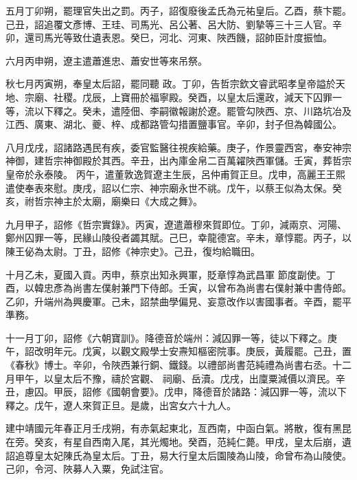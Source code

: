 \begin{pinyinscope}
 五月丁卯朔，罷理官失出之罰。丙子，詔復廢後孟氏為元祐皇后。乙酉，蔡卞罷。己丑，詔追覆文彥博、王珪、司馬光、呂公著、呂大防、劉摯等三十三人官。辛卯，還司馬光等致仕遺表恩。癸巳，河北、河東、陜西饑，詔帥臣計度振恤。



 六月丙申朔，遼主遣蕭進忠、蕭安世等來吊祭。



 秋七月丙寅朔，奉皇太后詔，罷同聽
 政。丁卯，告哲宗欽文睿武昭孝皇帝謚於天地、宗廟、社稷。戊辰，上寶冊於福寧殿。癸酉，以皇太后還政，減天下囚罪一等，流以下釋之。癸未，遣陸佃、李嗣徽報謝於遼。罷管勾陜西、京、川路坑冶及江西、廣東、湖北、夔、梓、成都路管勾措置鹽事官。辛卯，封子但為韓國公。



 八月戊戌，詔諸路遇民有疾，委官監醫往視疾給藥。庚子，作景靈西宮，奉安神宗神御，建哲宗神御殿於其西。辛丑，出內庫金帛二百萬糴陜西軍儲。壬寅，葬哲宗皇帝於永泰陵。
 丙午，遣董敦逸賀遼主生辰，呂仲甫賀正旦。戊申，高麗王王熙遣使奉表來慰。庚戌，詔以仁宗、神宗廟永世不祧。戊午，以蔡王似為太保。癸亥，祔哲宗神主於太廟，廟樂曰《大成之舞》。



 九月甲子，詔修《哲宗實錄》。丙寅，遼遣蕭穆來賀即位。丁卯，減兩京、河陽、鄭州囚罪一等，民緣山陵役者蠲其賦。己巳，幸龍德宮。辛未，章惇罷。丙子，以陳王佖為太尉。丁丑，詔修《神宗史》。己丑，復均給職田。



 十月乙未，夏國入貢。丙申，蔡京出知永興軍，貶章惇為武昌軍
 節度副使。丁酉，以韓忠彥為尚書左僕射兼門下侍郎。壬寅，以曾布為尚書右僕射兼中書侍郎。乙卯，升端州為興慶軍。己未，詔禁曲學偏見、妄意改作以害國事者。辛酉，罷平準務。



 十一月丁卯，詔修《六朝寶訓》。降德音於端州：減囚罪一等，徒以下釋之。庚午，詔改明年元。戊寅，以觀文殿學士安燾知樞密院事。庚辰，黃履罷。己丑，置《春秋》博士。辛卯，令陜西兼行銅、鐵錢。以禮部尚書范純禮為尚書右丞。十二月甲午，以皇太后不豫，禱於宮觀、
 祠廟、岳瀆。戊戌，出廩粟減價以濟民。辛丑，慮囚。甲辰，詔修《國朝會要》。戊申，降德音於諸路：減囚罪一等，流以下釋之。戊午，遼人來賀正旦。是歲，出宮女六十九人。



 建中靖國元年春正月壬戌朔，有赤氣起東北，亙西南，中函白氣。將散，復有黑昆在旁。癸亥，有星自西南入尾，其光燭地。癸酉，范純仁薨。甲戌，皇太后崩，遺詔追尊皇太妃陳氏為皇太后。丁丑，易大行皇太后園陵為山陵，命曾布為山陵使。己卯，令河、陜募人入粟，免試注官。




\end{pinyinscope}
